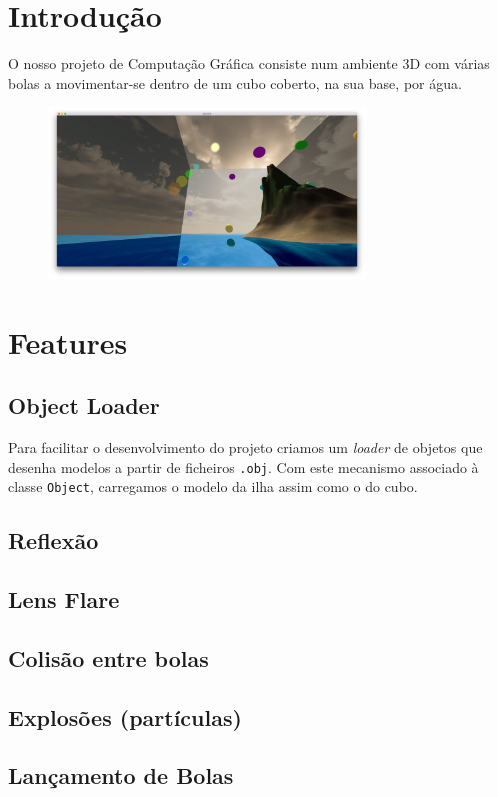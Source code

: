 \documentclass[12pt]{article}
\title{\TitleFont{Computação Gráfica}}
\author{David Gomes (2013136061) \and \vspace{-0.1cm} André Baptista (2013136742)}
\date{}
\begin{document}
\maketitle

\section*{Introdução}
O nosso projeto de Computação Gráfica consiste num ambiente 3D com várias bolas a movimentar-se
dentro de um cubo coberto, na sua base, por água.

\begin{figure}[H]
  \centering
  \includegraphics[width=0.75\textwidth]{screenshot}
\end{figure}

\section*{Features}
\subsection*{Object Loader}
Para facilitar o desenvolvimento do projeto criamos um \textit{loader} de objetos que desenha modelos
a partir de ficheiros \texttt{.obj}. Com este mecanismo associado à classe \texttt{Object}, carregamos o modelo da ilha assim como o do cubo.
\subsection*{Reflexão}
\subsection*{Lens Flare}
\subsection*{Colisão entre bolas}
\subsection*{Explosões (partículas)}
\subsection*{Lançamento de Bolas}
\end{document}
